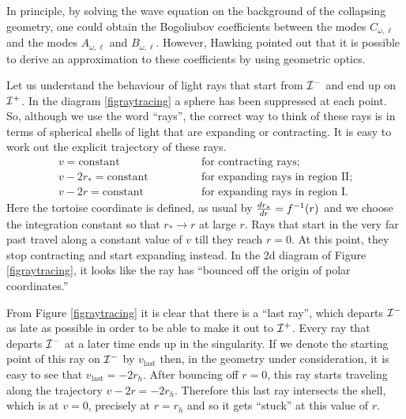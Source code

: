 \documentclass[12pt]{article}
\def\rtor{{r_*}}
\newcommand{\be}{\begin{equation}}
\newcommand{\ee}{\end{equation}}
\def \scrip{{\cal I}^{+}}
\def \scrim{{\cal I}^{-}}
\begin{document}
In principle, by solving the wave equation on the background of the collapsing geometry, one could obtain the Bogoliubov coefficients between the modes $C_{\omega, \ell}$ and the modes $A_{\omega, \ell}$ and $B_{\omega, \ell}$. However, Hawking pointed out that it is possible to derive an approximation to these coefficients by using geometric optics.

Let us understand the behaviour of light rays that start from $\scrim$ and end up on $\scrip$. In the diagram \ref{figraytracing} a sphere has been suppressed at each point. So, although we use the word ``rays'', the correct way to think of these rays is in terms of  spherical shells of light that are expanding or contracting. It is easy to work out the explicit trajectory of these rays.
\be
\begin{array}{ll}
v = \text{constant} \qquad & \qquad \text{for~contracting~rays}; \\
v - 2 \rtor = \text{constant} \qquad &\qquad \text{for~expanding~rays~in~region~II}; \\
v - 2 r = \text{constant} \qquad &\qquad \text{for~expanding~rays~in~region~I}.
\end{array}
\ee
Here the tortoise coordinate is defined, as usual by ${d \rtor \over d r} = f^{-1}(r)$ and we choose the integration constant so that $\rtor \rightarrow r$ at large $r$.
Rays that start in the very far past travel along a constant value of $v$ till they reach $r = 0$. At this point, they stop contracting and start expanding instead. In the 2d diagram of Figure \ref{figraytracing}, it looks like the ray has ``bounced off the origin of polar coordinates.''

From Figure \ref{figraytracing} it is clear that there is a ``last ray'', which departs $\scrim$ as late as possible in order to be able to make it out to $\scrip$. Every ray that departs $\scrim$ at a later time ends up in the singularity.  If we denote the starting point of this ray on $\scrim$ by $v_{\text{last}}$ then, in the geometry under consideration, it is easy to see that $v_{\text{last}} = -2 r_h$.   After bouncing off $r = 0$, this ray starts traveling along the trajectory $v - 2 r = -2 r_h$. Therefore this last ray intersects the shell, which is at $v =0$, precisely at $r = r_h$ and so it gets ``stuck'' at this value of $r$.
\end{document}
